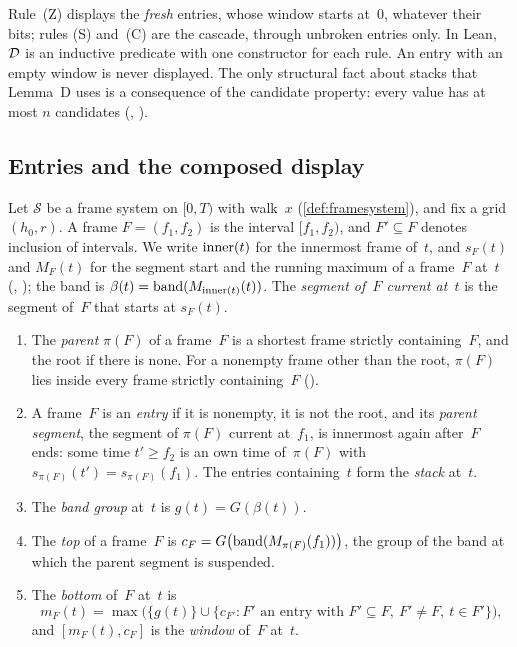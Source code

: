 Rule~(Z) displays the \emph{fresh} entries, whose window starts at~$0$, whatever their bits; rules (S) and~(C) are the cascade,
through unbroken entries only. In Lean, $\mathcal{D}$ is an inductive predicate with one constructor for each rule. An entry with an
empty window is never displayed. The only structural fact about stacks that Lemma~D uses is a consequence of the candidate
property: every value has at most $n$ candidates (, ).

\subsection{Entries and the composed display}\label{sec:displays-entries}

Let $\mathcal S$ be a frame system on $[0,T)$ with walk~$x$ (\cref{def:framesystem}), and fix a grid $(h_0,r)$. A frame $F=(f_1,f_2)$
is the interval $[f_1,f_2)$, and $F'\subseteq F$ denotes inclusion of intervals. We write $\operatorname{inner}(t)$ for the innermost frame
of~$t$, and $s_F(t)$ and $M_F(t)$ for the segment start and the running maximum of a frame~$F$ at~$t$
(, ); the band is $\beta(t)=\operatorname{band}(M_{\operatorname{inner}(t)}(t))$. The \emph{segment of~$F$
current at~$t$} is the segment of~$F$ that starts at $s_F(t)$.

\begin{definition}\label{def:entries}
\begin{enumerate}[label=(\alph*)]
\item The \emph{parent} $\pi(F)$ of a frame~$F$ is a shortest frame strictly containing~$F$, and the root if there is none. For a
nonempty frame other than the root, $\pi(F)$ lies inside every frame strictly containing~$F$ ().
\item A frame~$F$ is an \emph{entry} if it is nonempty, it is not the root, and its \emph{parent segment}, the segment of $\pi(F)$
current at~$f_1$, is innermost again after~$F$ ends: some time $t'\ge f_2$ is an own time of~$\pi(F)$ with
$s_{\pi(F)}(t')=s_{\pi(F)}(f_1)$. The entries containing~$t$ form the \emph{stack} at~$t$.
\item The \emph{band group} at~$t$ is $g(t)=G(\beta(t))$.
\item The \emph{top} of a frame~$F$ is $c_F=G\bigl(\operatorname{band}(M_{\pi(F)}(f_1))\bigr)$, the group of the band at which the parent segment is
suspended.
\item The \emph{bottom} of~$F$ at~$t$ is
\[
  m_F(t)=\max\bigl(\{g(t)\}\cup\{c_{F'}:F'\text{ an entry with }F'\subseteq F,\ F'\ne F,\ t\in F'\}\bigr),
\]
and $[m_F(t),c_F]$ is the \emph{window} of~$F$ at~$t$.
\end{enumerate}
\end{definition}

